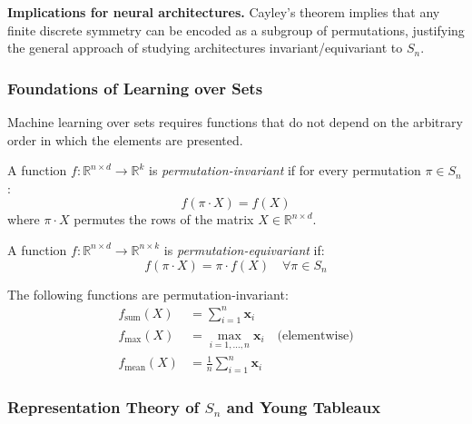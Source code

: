 \textbf{Implications for neural architectures.} Cayley's theorem implies that any finite discrete symmetry can be encoded as a subgroup of permutations, justifying the general approach of studying architectures invariant/equivariant to $S_n$.

\subsubsection{Foundations of Learning over Sets}

Machine learning over sets requires functions that do not depend on the arbitrary order in which the elements are presented.

\begin{definition}\label{def:permutation_invariant_function}
A function $f: \mathbb{R}^{n \times d} \to \mathbb{R}^k$ is \textit{permutation-invariant} if for every permutation $\pi \in S_n$:
\begin{equation}
f(\pi \cdot X) = f(X)
\end{equation}
where $\pi \cdot X$ permutes the rows of the matrix $X \in \mathbb{R}^{n \times d}$.
\end{definition}

\begin{definition}\label{def:permutation_equivariant_function}
A function $f: \mathbb{R}^{n \times d} \to \mathbb{R}^{n \times k}$ is \textit{permutation-equivariant} if:
\begin{equation}
f(\pi \cdot X) = \pi \cdot f(X) \quad \forall \pi \in S_n
\end{equation}
\end{definition}

\begin{example}
The following functions are permutation-invariant:
\begin{align}
f_{\text{sum}}(X) &= \sum_{i=1}^n \mathbf{x}_i \\
f_{\text{max}}(X) &= \max_{i=1,\ldots,n} \mathbf{x}_i \quad \text{(elementwise)} \\
f_{\text{mean}}(X) &= \frac{1}{n}\sum_{i=1}^n \mathbf{x}_i
\end{align}
\end{example}

\subsubsection{Representation Theory of $S_n$ and Young Tableaux}

